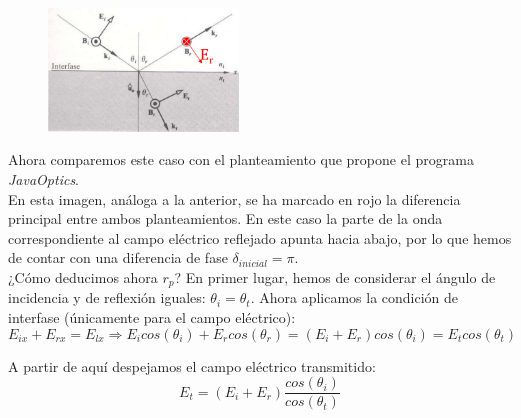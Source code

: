 \documentclass[11pt]{article}
\begin{document}
    \begin{figure}
        \vspace{-0.5cm}
        \centering
        \includegraphics[width=0.45\textwidth]{fotos/criterio_programa.png}
    \end{figure}
    \noindent Ahora comparemos este caso con el planteamiento que propone el programa \textit{JavaOptics}.\\
    
    \noindent En esta imagen, análoga a la anterior, se ha marcado en rojo la diferencia principal entre ambos planteamientos. En este caso la parte de la onda correspondiente al campo eléctrico reflejado apunta hacia abajo, por lo que hemos de contar con una diferencia de fase $\delta_{inicial} = \pi$.\\
    
    \noindent ¿Cómo deducimos ahora $r_p$? En primer lugar, hemos de considerar el ángulo de incidencia y de reflexión iguales: $\theta_i = \theta_t$. Ahora aplicamos la condición de interfase (únicamente para el campo eléctrico):
    \begin{equation*}
        E_{ix} + E_{rx} = E_{lx} \Longrightarrow E_icos(\theta_i) + E_rcos(\theta_r) = (E_i + E_r)cos(\theta_i) = E_tcos(\theta_t) 
    \end{equation*}
    
    \noindent A partir de aquí despejamos el campo eléctrico transmitido:
    \begin{equation}
        E_t = (E_i+E_r)\frac{cos(\theta_i)}{cos(\theta_t)}
    \end{equation} \label{eq:paso1}
\end{document}
